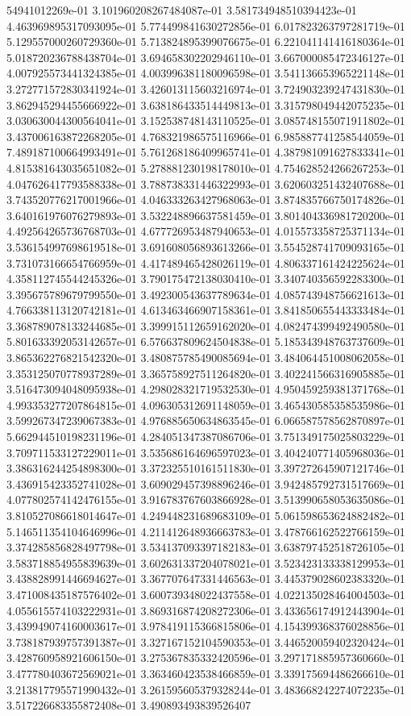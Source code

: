 54941012269e-01	3.101960208267484087e-01	3.581734948510394423e-01	4.463969895317093095e-01	5.774499841630272856e-01	6.017823263797281719e-01	5.129557000260729360e-01	5.713824895399076675e-01	6.221041141416180364e-01	5.018720236788438704e-01	3.694658302202946110e-01	3.667000085472346127e-01	4.007925573441324385e-01	4.003996381180096598e-01	3.541136653965221148e-01	3.272771572830341924e-01	3.426013115603216974e-01	3.724903239247431830e-01	3.862945294455666922e-01	3.638186433514449813e-01	3.315798049442075235e-01	3.030630044300564041e-01	3.152538748143110525e-01	3.085748155071911802e-01	3.437006163872268205e-01	4.768321986575116966e-01	6.985887741258544059e-01	7.489187100664993491e-01	5.761268186409965741e-01	4.387981091627833341e-01	4.815381643035651082e-01	5.278881230198178010e-01	4.754628524266267253e-01	4.047626417793588338e-01	3.788738331446322993e-01	3.620603251432407688e-01	3.743520776217001966e-01	4.046333263427968063e-01	3.874835766750174826e-01	3.640161976076279893e-01	3.532248896637581459e-01	3.801404336981720200e-01	4.492564265736768703e-01	4.677726953487940653e-01	4.015573358725371134e-01	3.536154997698619518e-01	3.691608056893613266e-01	3.554528741709093165e-01	3.731073166654766959e-01	4.417489465428026119e-01	4.806337161424225624e-01	4.358112745544245326e-01	3.790175472138030410e-01	3.340740356592283300e-01	3.395675789679799550e-01	3.492300543637789634e-01	4.085743948756621613e-01	4.766338113120742181e-01	4.613463466907158361e-01	3.841850655443333484e-01	3.368789078133244685e-01	3.399915112659162020e-01	4.082474399492490580e-01	5.801633392053142657e-01	6.576637809624504838e-01	5.185343948763737609e-01	3.865362276821542320e-01	3.480875785490085694e-01	3.484064451008062058e-01	3.353125070778937289e-01	3.365758927511264820e-01	3.402241566316905885e-01	3.516473094048095938e-01	4.298028321719532530e-01	4.950459259381371768e-01	4.993353277207864815e-01	4.096305312691148059e-01	3.465430585358535986e-01	3.599267347239067383e-01	4.976885650634863545e-01	6.066587578562870897e-01	5.662944510198231196e-01	4.284051347387086706e-01	3.751349175025803229e-01	3.709711533127229011e-01	3.535686164696597023e-01	3.404240771405968036e-01	3.386316244254898300e-01	3.372325510161511830e-01	3.397272645907121746e-01	3.436915423352741028e-01	3.609029457398896246e-01	3.942485792731517669e-01	4.077802574142476155e-01	3.916783767603866928e-01	3.513990658053635086e-01	3.810527086618014647e-01	4.249448231689683109e-01	5.061598653624882482e-01	5.146511354104646996e-01	4.211412648936663783e-01	3.478766162522766159e-01	3.374285856828497798e-01	3.534137093397182183e-01	3.638797452518726105e-01	3.583718854955839639e-01	3.602631337204078021e-01	3.523423133338129953e-01	3.438828991446694627e-01	3.367707647331446563e-01	3.445379028602383320e-01	3.471008435187576402e-01	3.600739348022437558e-01	4.022135028464004503e-01	4.055615574103222931e-01	3.869316874208272306e-01	3.433656174912443904e-01	3.439949074160003617e-01	3.978419115366815806e-01	4.154399368376028856e-01	3.738187939757391387e-01	3.327167152104590353e-01	3.446520059402320424e-01	3.428760958921606150e-01	3.275367835332420596e-01	3.297171885957360660e-01	3.477780403672569021e-01	3.363460423538466859e-01	3.339175694486266610e-01	3.213817795571990432e-01	3.261595605379328244e-01	3.483668242274072235e-01	3.517226683355872408e-01	3.490893493839526407